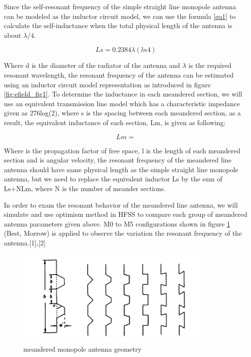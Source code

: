 Since the self-resonant frequency of the simple straight line monopole antenna can be modeled as the inductor circuit model, we can use the formula \eqref{eq1} to calculate the self-inductance when the total physical length of the antenna is about $\lambda/4$. 

\begin{equation}\label{eq1}Ls = 0.2384 λ (ln 4) \end{equation}

Where d is the diameter of the radiator of the antenna and $\lambda$ is the required resonant wavelength, the resonant frequency of the antenna can be estimated using an inductor circuit model representation as introduced in figure \ref{fig:efield_fig1}. To determine the inductance in each meandered section, we will use an equivalent transmission line model which has a characteristic impedance given as 276log(2), where s is the spacing between each meandered section, as a result, the equivalent inductance of each section, Lm, is given as following:

\begin{equation}\label{eq2}Lm =  \end{equation}

Where  is the propagation factor of free space, l is the length of each meandered section and is angular velocity, the resonant frequency of the meandered line antenna should have same physical length as the simple straight line monopole antenna, but we need to replace the equivalent inductor Ls by the sum of Ls+NLm, where N is the number of meander sections.

In order to exam the resonant behavior of the meandered line antenna, we will simulate and use optimism method in HFSS to compare each group of meandered antenna parameters given above. M0 to M5 configurations shown in figure \ref{fig:efield_fig2} (Best, Morrow) is applied to observe the variation the resonant frequency of the antenna.[1],[2]

\begin{figure}[h]
	\begin{center}
		\includegraphics[width=3.8in]{./images/efield_image2.png}
		\caption{meandered monopole antenna geometry}
		\label{fig:efield_fig2}
	\end{center}
\end{figure}

